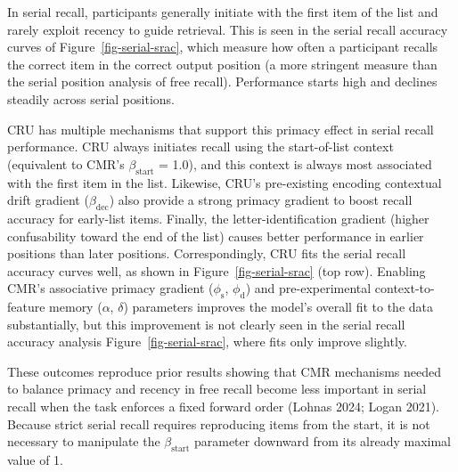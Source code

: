 \documentclass[
  letterpaper,
  11pt,
  english,
  singlespacing,
  headsepline]{MastersDoctoralThesis}
\begin{document}
In serial recall, participants generally initiate with the first item of
the list and rarely exploit recency to guide retrieval. This is seen in
the serial recall accuracy curves of Figure~\ref{fig-serial-srac}, which
measure how often a participant recalls the correct item in the correct
output position (a more stringent measure than the serial position
analysis of free recall). Performance starts high and declines steadily
across serial positions.

CRU has multiple mechanisms that support this primacy effect in serial
recall performance. CRU always initiates recall using the start-of-list
context (equivalent to CMR's \(\beta_\text{start}\) = 1.0), and this
context is always most associated with the first item in the list.
Likewise, CRU's pre-existing encoding contextual drift gradient
(\(\beta_\text{dec}\)) also provide a strong primacy gradient to boost
recall accuracy for early-list items. Finally, the letter-identification
gradient (higher confusability toward the end of the list) causes better
performance in earlier positions than later positions. Correspondingly,
CRU fits the serial recall accuracy curves well, as shown in
Figure~\ref{fig-serial-srac} (top row). Enabling CMR's associative
primacy gradient (\(\phi_\text{s}\), \(\phi_\text{d}\)) and
pre-experimental context-to-feature memory (\(\alpha\), \(\delta\))
parameters improves the model's overall fit to the data substantially,
but this improvement is not clearly seen in the serial recall accuracy
analysis Figure~\ref{fig-serial-srac}, where fits only improve slightly.

These outcomes reproduce prior results showing that CMR mechanisms
needed to balance primacy and recency in free recall become less
important in serial recall when the task enforces a fixed forward order
(Lohnas 2024; Logan 2021). Because strict serial recall requires
reproducing items from the start, it is not necessary to manipulate the
\(\beta_\text{start}\) parameter downward from its already maximal value
of 1.
\end{document}
